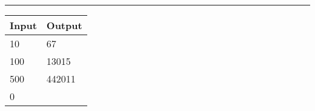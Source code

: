 \documentclass{article}
\begin{document}
    \\\rule[5pt]{18cm}{0.01em}
    \begin{table}[h] \Large
        \centering  
        \begin{tabular}{| p{8cm} | p{8cm} |}%
        \hline 
        \fontsize{18pt}{1pt}
        \Large Input&\Large Output
        \\ \hline  
        10&67\\
        100&13015 \\ 
        500&442011 \\
        0& \\
        \hline 
        \end{tabular}
    \end{table}
\end{document}
